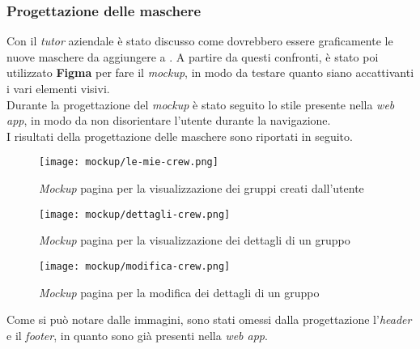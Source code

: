 \subsubsection{Progettazione delle maschere}
Con il \textit{tutor} aziendale è stato discusso come dovrebbero essere
graficamente le nuove maschere da aggiungere a \productName. A partire da
questi confronti, è stato poi utilizzato \textbf{Figma} per fare il
\textit{mockup}, in modo da  testare quanto siano accattivanti i vari elementi visivi.\\
Durante la progettazione del \textit{mockup} è stato seguito lo stile presente
nella \textit{web app}, in modo da non disorientare l'utente durante la
navigazione. \\
I risultati della progettazione delle maschere sono riportati in seguito.
\begin{figure}[H]
    \centerline{\texttt{[image: mockup/le-mie-crew.png]}}
    \caption{\textit{Mockup} pagina per la visualizzazione dei gruppi creati
        dall'utente}
\end{figure}


\begin{figure}[H]
    \centering
    \texttt{[image: mockup/dettagli-crew.png]}
    \caption{\textit{Mockup} pagina per la visualizzazione dei dettagli di un
        gruppo}
\end{figure}

\begin{figure}[H]
    \centering
    \texttt{[image: mockup/modifica-crew.png]}
    \caption{\textit{Mockup} pagina per la modifica dei dettagli di un gruppo}
\end{figure}

Come si può notare dalle immagini, sono stati omessi dalla progettazione
l'\textit{header} e il \textit{footer}, in quanto sono già presenti nella
\textit{web app}.



